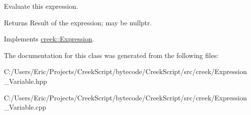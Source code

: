 Evaluate this expression. 

\begin{DoxyReturn}{Returns}
Result of the expression; may be {\ttfamily nullptr}. 
\end{DoxyReturn}


Implements \hyperlink{classcreek_1_1_expression_a3c7fe4a04e24c8d907f918240e2bf43d}{creek\+::\+Expression}.



The documentation for this class was generated from the following files\+:\begin{DoxyCompactItemize}
\item 
C\+:/\+Users/\+Eric/\+Projects/\+Creek\+Script/bytecode/\+Creek\+Script/src/creek/Expression\+\_\+\+Variable.\+hpp\item 
C\+:/\+Users/\+Eric/\+Projects/\+Creek\+Script/bytecode/\+Creek\+Script/src/creek/Expression\+\_\+\+Variable.\+cpp\end{DoxyCompactItemize}
